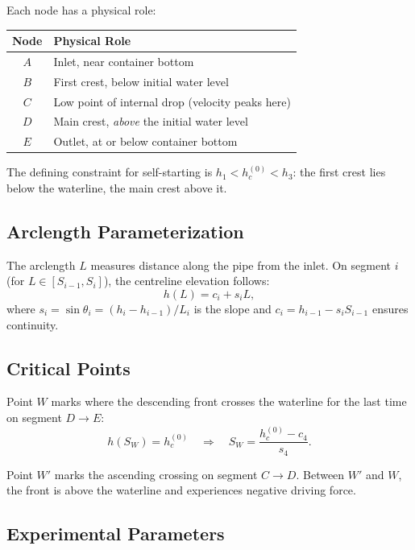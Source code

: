 \documentclass[11pt,a4paper]{article}
\theoremstyle{definition}
\begin{document}
Each node has a physical role:
\begin{center}
\renewcommand{\arraystretch}{1.2}
\begin{tabular}{cl}
\toprule
Node & Physical Role \\
\midrule
$A$ & Inlet, near container bottom \\
$B$ & First crest, below initial water level \\
$C$ & Low point of internal drop (velocity peaks here) \\
$D$ & Main crest, \emph{above} the initial water level \\
$E$ & Outlet, at or below container bottom \\
\bottomrule
\end{tabular}
\end{center}

The defining constraint for self-starting is $h_1 < h_c^{(0)} < h_3$: the first crest lies below the waterline, the main crest above it.

\subsection{Arclength Parameterization}

The arclength $L$ measures distance along the pipe from the inlet. On segment $i$ (for $L \in [S_{i-1}, S_i]$), the centreline elevation follows:
\begin{equation}
  h(L) = c_i + s_i L,
  \label{eq:hL-piecewise}
\end{equation}
where $s_i = \sin\theta_i = (h_i - h_{i-1})/L_i$ is the slope and $c_i = h_{i-1} - s_i S_{i-1}$ ensures continuity.

\subsection{Critical Points}

Point $W$ marks where the descending front crosses the waterline for the last time on segment $D \to E$:
\begin{equation}
  h(S_W) = h_c^{(0)} \quad \Rightarrow \quad S_W = \frac{h_c^{(0)} - c_4}{s_4}.
  \label{eq:SW-def}
\end{equation}

Point $W'$ marks the ascending crossing on segment $C \to D$. Between $W'$ and $W$, the front is above the waterline and experiences negative driving force.

\subsection{Experimental Parameters}
\end{document}
